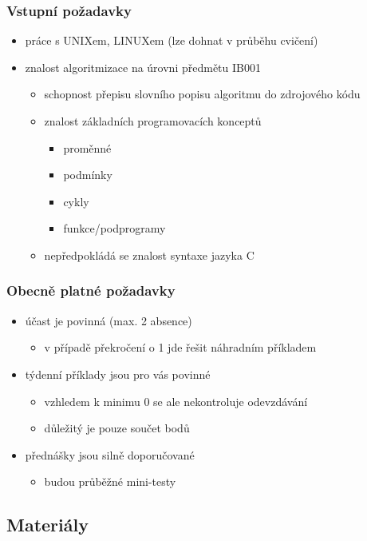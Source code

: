 \begin{frame}
	\frametitle{Vstupní požadavky}
	\begin{itemize}
		\item{práce s UNIXem, LINUXem (lze dohnat v průběhu cvičení)}
		\item{znalost algoritmizace na úrovni předmětu IB001}
		\begin{itemize}
			\item{schopnost přepisu slovního popisu algoritmu do zdrojového kódu}
			\item{znalost základních programovacích konceptů}
			\begin{itemize}
				\item{proměnné}
				\item{podmínky}
				\item{cykly}
				\item{funkce/podprogramy}
			\end{itemize}
			\item{nepředpokládá se znalost syntaxe jazyka C}
		\end{itemize}
	\end{itemize}
\end{frame}

\begin{frame}
	\frametitle{Obecně platné požadavky}
	\begin{itemize}
		\item{účast je povinná (max. 2 absence)}
		\begin{itemize}
			\item{v případě překročení o 1 jde řešit náhradním příkladem}
		\end{itemize}
		\item{týdenní příklady jsou pro vás povinné}
		\begin{itemize}
			\item{vzhledem k minimu 0 se ale nekontroluje odevzdávání}
			\item{důležitý je pouze součet bodů}
		\end{itemize}
		\item{přednášky jsou silně doporučované}
		\begin{itemize}
			\item{budou průběžné mini-testy}
		\end{itemize}
	\end{itemize}
\end{frame}

\subsection{Materiály}

